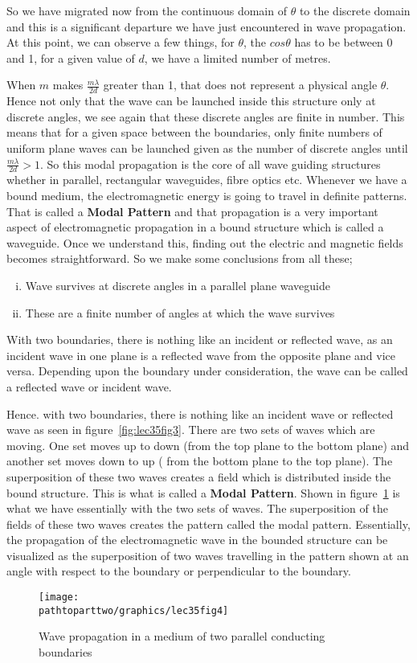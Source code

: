 So we have migrated now from the continuous domain of $\theta$ to the discrete domain and this is a significant departure we have just encountered in wave propagation. At this point, we can observe a few things, for $\theta$, the $cos\theta$ has to be between 0 and 1, for a given value of $d$, we have a limited number of metres.

When $m$ makes $\frac{m\lambda}{2d}$ greater than 1, that does not represent a physical angle $\theta$. Hence not only that the wave can be launched inside this structure only at discrete angles, we see again that these discrete angles are finite in number. This means that for a given space between the boundaries, only finite numbers of uniform plane waves can be launched given as the number of discrete angles until $\frac{m\lambda}{2d} > 1$.  So this modal propagation is the core of all wave guiding structures whether in parallel, rectangular waveguides, fibre optics etc. Whenever we have a bound medium, the electromagnetic energy is going to travel in definite patterns. That is called a \textbf{Modal Pattern} and that propagation is a very important aspect of electromagnetic propagation in a bound structure which is called a waveguide. Once we understand this, finding out the electric and magnetic fields becomes straightforward. So we make some conclusions from all these;
\begin{enumerate}[(i)]
\item Wave survives at discrete angles in a parallel plane waveguide
\item These are a finite number of angles at which the wave survives
\end{enumerate}

With two boundaries, there is nothing like an incident or reflected wave, as an incident wave in one plane is a reflected wave from the opposite plane and vice versa. Depending upon the boundary under consideration, the wave can be called a reflected wave or incident wave.

Hence. with two boundaries, there is nothing like an incident wave or reflected wave as seen in figure~\ref{fig:lec35fig3}. There are two sets of waves which are moving. One set moves up to down (from the top plane to the bottom plane) and another set moves down to up ( from the bottom plane to the top plane). The superposition of these two waves creates a field which is distributed inside the bound structure. This is what is called a \textbf{Modal Pattern}. Shown in figure~\ref{fig:lec35fig4} is what we have essentially with the two sets of waves. The superposition of the fields of these two waves creates the pattern called the modal pattern. Essentially, the propagation of the electromagnetic wave in the bounded structure can be visualized as the superposition of two waves travelling in the pattern shown at an angle with respect to the boundary or perpendicular to the boundary.
\begin{figure}[h]
\centering
\texttt{[image: \\pathtoparttwo/graphics/lec35fig4]}
\caption{Wave propagation in a medium of two parallel conducting boundaries}
\label{fig:lec35fig4}
\end{figure}

